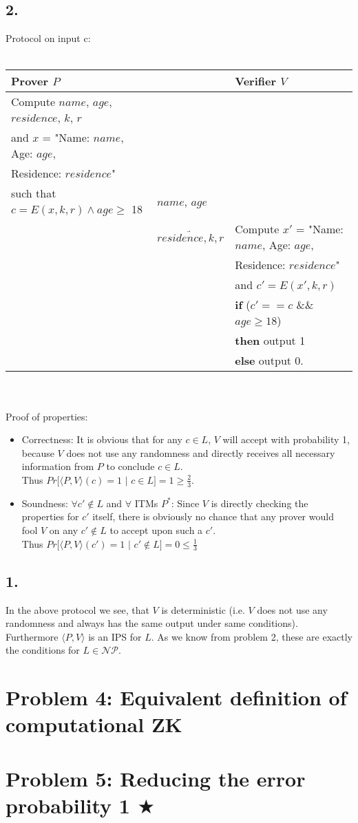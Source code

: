 \documentclass[12pt,pdftex,a4paper]{article}
\begin{document}
\subsection*{2.}
Protocol on input c:
\\~\\
\footnotesize
\begin{tabular}{lll}
Prover $P$ && Verifier $V$\\
\hline
Compute $name$, $age$, $residence$, $k$, $r$ 
\\and $x$ = "Name: $name$, Age: $age$, \\
Residence: $residence$"\\
such that $c = E(x, k, r) \land age \geq$ 18 & $name$, $age$\\
&$\underrightarrow{residence, k, r}$ & Compute $x'$ = "Name: $name$, Age: $age$, \\
&& Residence: $residence$"\\
&& and $c' = E(x', k, r)$\\
&& \textbf{if} ($c' == c$ \&\& $age \geq 18$)\\
&& \textbf{then} output 1\\
&& \textbf{else} output 0.\\
\end{tabular}\\~\\
\normalsize
Proof of properties:
\begin{itemize}
\item Correctness: It is obvious that for any $c \in L$, $V$ will accept with probability 1, because $V$ does not use any randomness and directly receives all necessary information from $P$ to conclude $c\in L$.\\Thus $Pr[\langle P, V\rangle (c)=1$ $|$ $c\in L] = 1 \geq \frac{2}{3}$.
\item Soundness: $\forall c'\notin L$ and $\forall$ ITMs $P^*$: Since $V$ is directly checking the properties for $c'$ itself, there is obviously no chance that any prover would fool $V$ on any $c'\notin L$ to accept upon such a $c'$.\\Thus $Pr[\langle P, V\rangle (c') = 1$ $|$ $c'\notin L] = 0 \leq \frac{1}{3}$
\end{itemize}

\subsection*{1.}
In the above protocol we see, that $V$ is deterministic (i.e. $V$ does not use any randomness and always has the same output under same conditions). Furthermore $\langle P, V \rangle$ is an IPS for $L$. As we know from problem 2, these are exactly the conditions for $L\in \mathcal{NP}$.

\section*{Problem 4: Equivalent definition of computational ZK}

\section*{Problem 5: Reducing the error probability 1 $\bigstar$}
\end{document}
